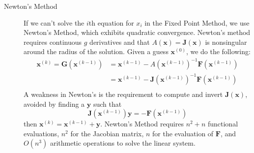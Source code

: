 \documentclass[8pt]{article}
\begin{document}
\begin{multicols}{2}
\begin{description}
      \pagebreak[4]
    \item[Newton's Method] If we can't solve the $i$th equation for $x_i$ in the Fixed Point Method,
      we use Newton's Method, which exhibits quadratic convergence. Newton's method requires
      continuous $g$ derivatives and that $A(\mathbf{x}) = \mathbf{J}(\mathbf{x})$ is nonsingular
      around the radius of the solution. 
      Given a guess $\mathbf{x}^{(0)}$, we do the following:
      \begin{align*}
        \mathbf{x}^{(k)}=\mathbf{G}(\mathbf{x}^{(k-1)})&=\mathbf{x}^{(k-1)}-A(\mathbf{x}^{(k-1)})^{-1}\mathbf{F}(\mathbf{x}^{(k-1)}) \\
        &=\mathbf{x}^{(k-1)}-\mathbf{J}(\mathbf{x}^{(k-1)})^{-1}\mathbf{F}(\mathbf{x}^{(k-1)}) \\
      \end{align*}
      A weakness in Newton's is the requirement to compute and invert $\mathbf{J}(\mathbf{x})$,
      avoided by finding a $\mathbf{y}$ such that
      $$\mathbf{J}(\mathbf{x}^{(k-1)})\mathbf{y}=-\mathbf{F}(\mathbf{x}^{(k-1)})$$
      then $\mathbf{x}^{(k)}=\mathbf{x}^{(k-1)}+\mathbf{y}$. Newton's Method requires $n^2+n$
      functional evaluations, $n^2$ for the Jacobian matrix, $n$ for the evaluation of $\mathbf{F}$,
      and $O(n^3)$ arithmetic operations to solve the linear system.



\end{description}
\end{multicols}
\end{document}
